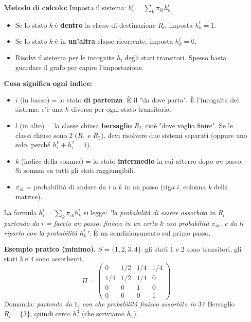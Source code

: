 \documentclass[12pt]{extarticle} %
\begin{document}
\textbf{Metodo di calcolo:}
Imposta il sistema: $h_i^l = \sum_{k} \pi_{ik} h_k^l$
\begin{itemize}
    \item Se lo stato $k$ è \textbf{dentro} la classe di destinazione $R_l$, imposta $h_k^l = 1$.
    \item Se lo stato $k$ è in \textbf{un'altra} classe ricorrente, imposta $h_k^l = 0$.
    \item Risolvi il sistema per le incognite $h_i$ degli stati transitori. Spesso basta guardare il grafo per capire l'impostazione.
\end{itemize}

\textbf{Cosa significa ogni indice:}
\begin{itemize}
    \item \textbf{$i$} (in basso) = lo stato \textbf{di partenza}. È il "da dove parto". È l'incognita del sistema: c'è una $h$ diversa per ogni stato transitorio.
    \item \textbf{$l$} (in alto) = la classe chiusa \textbf{bersaglio} $R_l$, cioè "dove voglio finire". Se le classi chiuse sono 2 ($R_1$ e $R_2$), devi risolvere due sistemi separati (oppure uno solo, perché $h_i^1 + h_i^2 = 1$).
    \item \textbf{$k$} (indice della somma) = lo stato \textbf{intermedio} in cui atterro dopo \emph{un} passo. Si somma su tutti gli stati raggiungibili.
    \item \textbf{$\pi_{ik}$} = probabilità di andare da $i$ a $k$ in un passo (riga $i$, colonna $k$ della matrice).
\end{itemize}
La formula $h_i^l = \sum_k \pi_{ik} h_k^l$ si legge: \emph{"la probabilità di essere assorbito in $R_l$ partendo da $i$ = faccio un passo, finisco in un certo $k$ con probabilità $\pi_{ik}$, e da lì riparto con la probabilità $h_k^l$"}. È un condizionamento sul primo passo.

\vspace{0.3cm}
\textbf{Esempio pratico (minimo).} $S=\{1,2,3,4\}$: gli stati $1$ e $2$ sono transitori, gli stati $3$ e $4$ sono assorbenti.
$$ \Pi = \begin{pmatrix} 0 & 1/2 & 1/4 & 1/4 \\ 1/4 & 1/2 & 1/4 & 0 \\ 0 & 0 & 1 & 0 \\ 0 & 0 & 0 & 1 \end{pmatrix} $$
Domanda: \emph{partendo da $1$, con che probabilità finisco assorbito in $3$?} Bersaglio $R_l = \{3\}$, quindi cerco $h_1^3$ (che scriviamo $h_1$).
\end{document}
